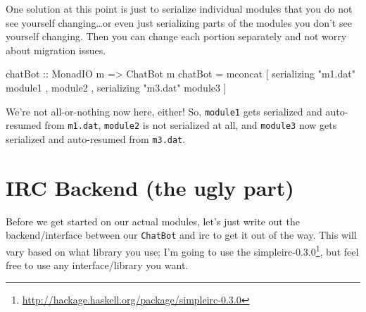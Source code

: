 \documentclass[]{article}
\newenvironment{Shaded}{}{}
\newcommand{\DataTypeTok}[1]{\textcolor[rgb]{0.56,0.13,0.00}{#1}}
\newcommand{\FunctionTok}[1]{\textcolor[rgb]{0.02,0.16,0.49}{#1}}
\newcommand{\NormalTok}[1]{#1}
\newcommand{\OtherTok}[1]{\textcolor[rgb]{0.00,0.44,0.13}{#1}}
\newcommand{\StringTok}[1]{\textcolor[rgb]{0.25,0.44,0.63}{#1}}
\renewcommand{\href}[2]{#2\footnote{\url{#1}}}
\begin{document}
One solution at this point is just to serialize individual modules that you do
not see yourself changing\ldots or even just serializing parts of the modules
you don't see yourself changing. Then you can change each portion separately and
not worry about migration issues.

\begin{Shaded}
\begin{Highlighting}[]
\OtherTok{chatBot ::} \DataTypeTok{MonadIO}\NormalTok{ m }\OtherTok{=>} \DataTypeTok{ChatBot}\NormalTok{ m}
\NormalTok{chatBot }\OtherTok{=} \FunctionTok{mconcat}\NormalTok{ [ serializing\textquotesingle{} }\StringTok{"m1.dat"}\NormalTok{ module1}
\NormalTok{                  , module2}
\NormalTok{                  , serializing\textquotesingle{} }\StringTok{"m3.dat"}\NormalTok{ module3}
\NormalTok{                  ]}
\end{Highlighting}
\end{Shaded}

We're not all-or-nothing now here, either! So, \texttt{module1} gets serialized
and auto-resumed from \texttt{m1.dat}, \texttt{module2} is not serialized at
all, and \texttt{module3} now gets serialized and auto-resumed from
\texttt{m3.dat}.

\hypertarget{irc-backend-the-ugly-part}{%
\section{IRC Backend (the ugly part)}\label{irc-backend-the-ugly-part}}

Before we get started on our actual modules, let's just write out the
backend/interface between our \texttt{ChatBot} and irc to get it out of the way.
This will vary based on what library you use; I'm going to use the
\href{http://hackage.haskell.org/package/simpleirc-0.3.0}{simpleirc-0.3.0}, but
feel free to use any interface/library you want.
\end{document}
